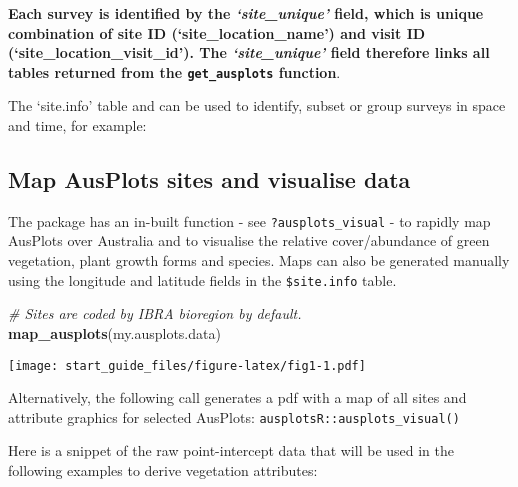 \documentclass[
]{article}
\newenvironment{Shaded}{\begin{snugshade}}{\end{snugshade}}
\newcommand{\CommentTok}[1]{\textcolor[rgb]{0.56,0.35,0.01}{\textit{#1}}}
\newcommand{\KeywordTok}[1]{\textcolor[rgb]{0.13,0.29,0.53}{\textbf{#1}}}
\newcommand{\NormalTok}[1]{#1}
\newcommand{\OperatorTok}[1]{\textcolor[rgb]{0.81,0.36,0.00}{\textbf{#1}}}
\begin{document}
\textbf{Each survey is identified by the \emph{`site\_unique'} field,
which is unique combination of site ID (`site\_location\_name') and
visit ID (`site\_location\_visit\_id'). The \emph{`site\_unique'} field
therefore links all tables returned from the \texttt{get\_ausplots}
function}.

The `site.info' table and can be used to identify, subset or group
surveys in space and time, for example:

\begin{Shaded}
\end{Shaded}

\hypertarget{map-ausplots-sites-and-visualise-data}{%
\subsection{Map AusPlots sites and visualise
data}\label{map-ausplots-sites-and-visualise-data}}

The package has an in-built function - see \texttt{?ausplots\_visual} -
to rapidly map AusPlots over Australia and to visualise the relative
cover/abundance of green vegetation, plant growth forms and species.
Maps can also be generated manually using the longitude and latitude
fields in the \texttt{\$site.info} table.

\begin{Shaded}
\begin{Highlighting}[]
\CommentTok{# Sites are coded by IBRA bioregion by default.}
\KeywordTok{map_ausplots}\NormalTok{(my.ausplots.data)}
\end{Highlighting}
\end{Shaded}

\texttt{[image: start\_guide\_files/figure-latex/fig1-1.pdf]}

Alternatively, the following call generates a pdf with a map of all
sites and attribute graphics for selected AusPlots:
\texttt{ausplotsR::ausplots\_visual()}

Here is a snippet of the raw point-intercept data that will be used in
the following examples to derive vegetation attributes:
\end{document}
